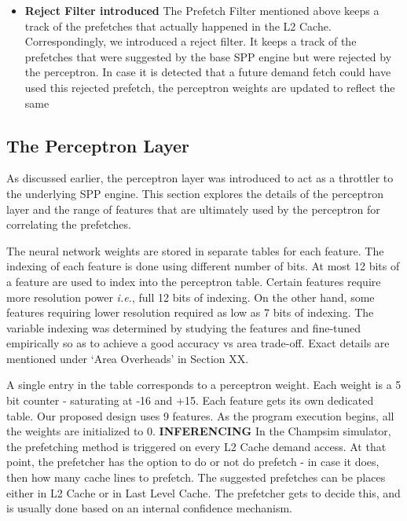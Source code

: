 \documentclass{sig-alternate}
\begin{document}
\begin{itemize}
\item \textbf{Reject Filter introduced}\newline
The Prefetch Filter mentioned above keeps a track of the prefetches that actually happened in the L2 Cache. 
Correspondingly, we introduced a reject filter. 
It keeps a track of the prefetches that were suggested by the base SPP engine but were rejected by the perceptron. 
In case it is detected that a future demand fetch could have used this rejected prefetch, the perceptron weights are updated to reflect the same

\end{itemize}

\subsection{The Perceptron Layer}
As discussed earlier, the perceptron layer was introduced to act as a throttler to the underlying SPP engine. 
This section explores the details of the perceptron layer and the range of features that are ultimately used by the perceptron for correlating the prefetches.

The neural network weights are stored in separate tables for each feature.
The indexing of each feature is done using different number of bits.
At most 12 bits of a feature are used to index into the perceptron table.
Certain features require more resolution power \textit{i.e.}, full 12 bits of indexing.
On the other hand, some features requiring lower resolution required as low as 7 bits of indexing.
The variable indexing was determined by studying the features and fine-tuned empirically so as to achieve a good accuracy vs area trade-off.
Exact details are mentioned under `Area Overheads' in Section XX.

A single entry in the table corresponds to a perceptron weight.
Each weight is a 5 bit counter - saturating at -16 and +15. 
Each feature gets its own dedicated table. 
Our proposed design uses 9 features. 
As the program execution begins, all the weights are initialized to 0.
\newline \newline
\textbf{INFERENCING}\newline
In the Champsim simulator, the prefetching method is triggered on every L2 Cache demand access. 
At that point, the prefetcher has the option to do or not do prefetch - in case it does, then how many cache lines to prefetch. 
The suggested prefetches can be places either in L2 Cache or in Last Level Cache. 
The prefetcher gets to decide this, and is usually done based on an internal confidence mechanism.
\end{document}
